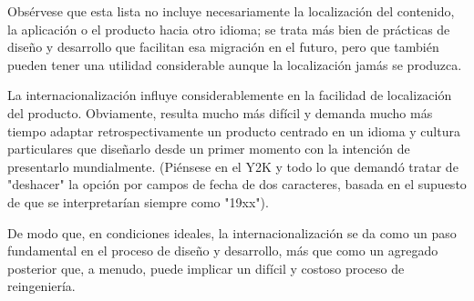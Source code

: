 Obsérvese que esta lista no incluye necesariamente la localización del contenido, la aplicación o el producto hacia otro idioma; se trata más bien de prácticas de diseño y desarrollo que facilitan esa migración en el futuro, pero que también pueden tener una utilidad considerable aunque la localización jamás se produzca.

La internacionalización influye considerablemente en la facilidad de localización del producto. Obviamente, resulta mucho más difícil y demanda mucho más tiempo adaptar retrospectivamente un producto centrado en un idioma y cultura particulares que diseñarlo desde un primer momento con la intención de presentarlo mundialmente. (Piénsese en el Y2K y todo lo que demandó tratar de "deshacer" la opción por campos de fecha de dos caracteres, basada en el supuesto de que se interpretarían siempre como "19xx").

De modo que, en condiciones ideales, la internacionalización se da como un paso fundamental en el proceso de diseño y desarrollo, más que como un agregado posterior que, a menudo, puede implicar un difícil y costoso proceso de reingeniería.
